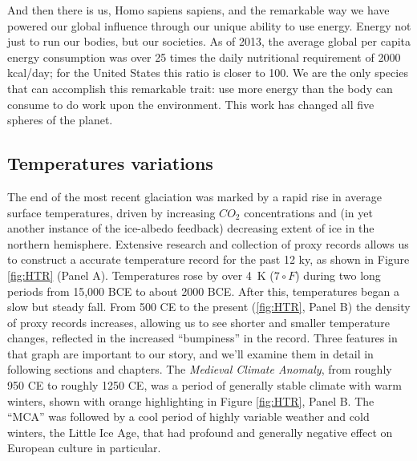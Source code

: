  
And then there is us, Homo sapiens sapiens, and the remarkable way we have powered our global influence through our unique ability to use energy. Energy not just to run our bodies, but our societies. As of 2013, the average global per capita energy consumption was over 25 times the daily nutritional requirement of 2000 kcal/day; for the United States this ratio is closer to 100. We are the only species that can accomplish this remarkable trait: use more energy than the body can consume to do work upon the environment. This work has changed all five spheres of the planet.

\subsection{Temperatures variations}
The end of the most recent glaciation was marked by a rapid rise in average surface temperatures, driven by increasing $CO_2$ concentrations and (in yet another instance of the ice-albedo feedback) decreasing extent of ice in the northern hemisphere. Extensive research and collection of proxy records allows us to construct a accurate temperature record for the past 12 ky, as shown in Figure \ref{fig:HTR} (Panel A). Temperatures rose by over \SI{4}{\kelvin} ($7\circ F$) during two long periods from 15,000 BCE to about 2000 BCE. After this, temperatures began a slow but steady fall. From 500 CE to the present (\ref{fig:HTR}, Panel B) the density of proxy records increases, allowing us to see shorter and smaller temperature changes, reflected in the increased ``bumpiness'' in the record. Three features in that graph are important to our story, and we'll examine them in detail in following sections and chapters. The \emph{Medieval Climate Anomaly}, from roughly 950 CE to roughly 1250 CE, was a period of generally stable climate with warm winters, shown with orange highlighting in Figure \ref{fig:HTR}, Panel B. The ``MCA'' was followed by a cool period of highly variable weather and cold winters, the Little Ice Age, that had profound and generally negative effect on European culture in particular.\\
